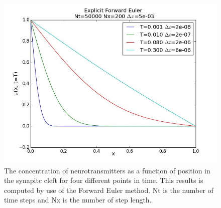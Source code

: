 \documentclass[12pt]{article}
\begin{document}
\begin{flushleft}
\begin{figure}[!h]
\begin{center}
\includegraphics[scale=0.35]{EF_Nt5000_Nx200}
\caption{\label{fig:forward_Euler_u}The concentration of neurotransmitters as a function of position in the synapitc cleft for four different points in time. This results is computed by use of the Forward Euler method. Nt is the number of time steps and Nx is the number of step length.}
\end{center}
\end{figure}


\end{flushleft}
\end{document}
